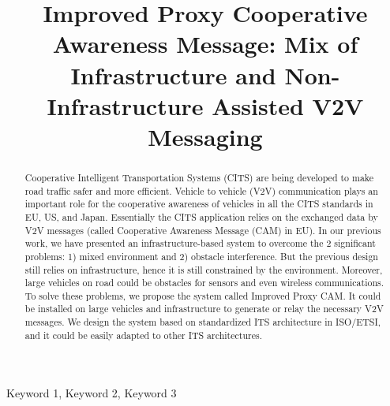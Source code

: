 \documentclass[conference,twocolumn]{IEEEtran}
\begin{document}
\title{Improved Proxy Cooperative Awareness Message: Mix of Infrastructure and Non-Infrastructure Assisted V2V Messaging}
\author{
}

\maketitle

\begin{abstract}
Cooperative Intelligent Transportation Systems
(CITS) are being developed to make road traffic safer and more efficient.
Vehicle to vehicle (V2V) communication plays an important role for the cooperative
awareness of vehicles in all the CITS standards in EU, US, and Japan.
Essentially the CITS application relies on the exchanged data by V2V messages (called Cooperative Awareness Message (CAM) in EU).
In our previous work, we have presented an infrastructure-based system to overcome the 2 significant problems:
1) mixed environment and 2) obstacle interference.
But the previous design still relies on infrastructure, hence it is still constrained by the environment.
Moreover, large vehicles on road could be obstacles for sensors and even wireless communications.
To solve these problems, we propose the system called Improved Proxy CAM.
It could be installed on large vehicles and infrastructure to generate or relay the necessary V2V messages.
We design the system based on standardized ITS architecture in ISO/ETSI, and it could be easily adapted to other ITS architectures.
\end{abstract}

\begin{IEEEkeywords}
 Keyword 1, Keyword 2, Keyword 3
\end{IEEEkeywords}









\end{document}
